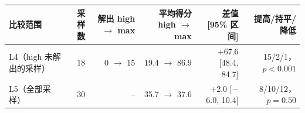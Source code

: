 \begin{tabular}{@{}lrrrrr@{}}
\toprule
比较范围 & 采样数 & 解出 high $\rightarrow$ max & 平均得分 high $\rightarrow$ max & 差值 [95\% 区间] & 提高/持平/降低 \\
\midrule
L4（high 未解出的采样） & 18 & 0 $\rightarrow$ 15 & 19.4 $\rightarrow$ 86.9 & +67.6 [48.4, 84.7] & 15/2/1，$p<0.001$ \\
L5（全部采样） & 30 & -- & 35.7 $\rightarrow$ 37.6 & +2.0 [$-$6.0, 10.4] & 8/10/12，$p=0.50$ \\
\bottomrule
\end{tabular}
